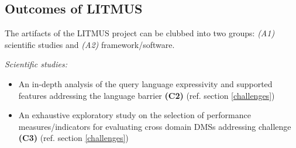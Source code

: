 \documentclass{llncs}
\begin{document}
    \subsection{Outcomes of LITMUS}\label{outcomes}
    The artifacts of the LITMUS project can be clubbed into two groups: \textit{(A1)} scientific studies and \textit{(A2)} framework/software. 
    
    \textit{Scientific studies:} 
        \begin{itemize}[nosep]
            \item An in-depth analysis of the query language expressivity and supported features addressing the language barrier \textbf{(C2)} (ref. section \ref{challenges})
            \item An exhaustive exploratory study on the selection of performance measures/indicators for evaluating cross domain DMSs addressing challenge \textbf{(C3)} (ref. section \ref{challenges})
        \end{itemize}
        
\end{document}
